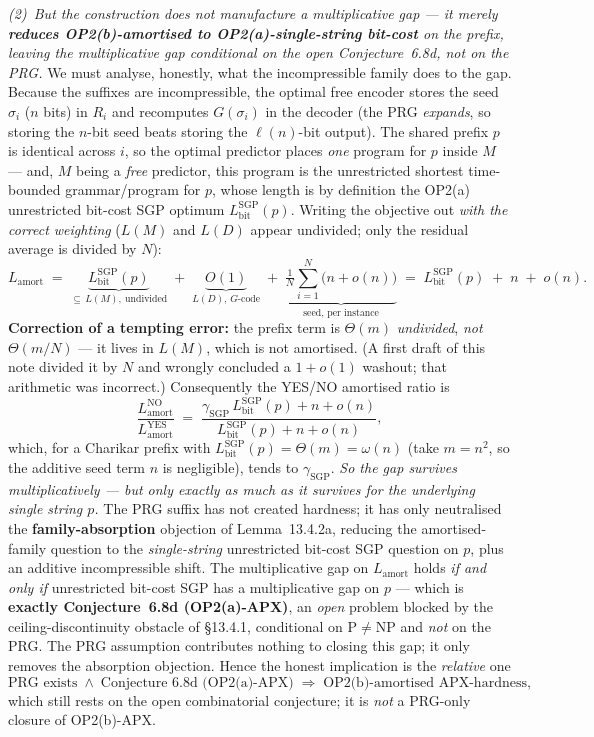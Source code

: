 \documentclass[
]{article}
\begin{document}
\emph{(2)~But the construction does not \emph{manufacture} a
multiplicative gap --- it merely \textbf{reduces OP2(b)-amortised to
OP2(a)-single-string bit-cost} on the prefix, leaving the multiplicative
gap conditional on the \emph{open} Conjecture~6.8d, not on the PRG.} We
must analyse, honestly, what the incompressible family does to the gap.
Because the suffixes are incompressible, the optimal free encoder stores
the seed $\sigma_i$ ($n$ bits) in $R_i$ and recomputes $G(\sigma_i)$ in
the decoder (the PRG \emph{expands}, so storing the $n$-bit seed beats
storing the $\ell(n)$-bit output). The shared prefix $p$ is identical
across $i$, so the optimal predictor places \emph{one} program for $p$
inside $M$ --- and, $M$ being a \emph{free} predictor, this program is
the unrestricted shortest time-bounded grammar/program for $p$, whose
length is by definition the OP2(a) unrestricted bit-cost SGP optimum
$L^{\mathrm{SGP}}_{\mathrm{bit}}(p)$. Writing the objective out
\emph{with the correct weighting} ($L(M)$ and $L(D)$ appear undivided;
only the residual average is divided by $N$):
\[
  L_{\mathrm{amort}}
  \;=\; \underbrace{L^{\mathrm{SGP}}_{\mathrm{bit}}(p)}_{\subseteq\, L(M),\ \text{undivided}}
  \;+\; \underbrace{O(1)}_{L(D),\,G\text{-code}}
  \;+\; \underbrace{\tfrac1N\textstyle\sum_{i=1}^N \big(n+o(n)\big)}_{\text{seed, per instance}}
  \;=\; L^{\mathrm{SGP}}_{\mathrm{bit}}(p) \;+\; n \;+\; o(n).
\]
\textbf{Correction of a tempting error:} the prefix term is
$\Theta(m)$ \emph{undivided}, \emph{not} $\Theta(m/N)$ --- it lives in
$L(M)$, which is not amortised. (A first draft of this note divided it
by $N$ and wrongly concluded a $1+o(1)$ washout; that arithmetic was
incorrect.) Consequently the YES/NO amortised ratio is
\[
  \frac{L_{\mathrm{amort}}^{\mathrm{NO}}}{L_{\mathrm{amort}}^{\mathrm{YES}}}
  \;=\;\frac{\gamma_{\mathrm{SGP}}\,L^{\mathrm{SGP}}_{\mathrm{bit}}(p)+n+o(n)}
           {L^{\mathrm{SGP}}_{\mathrm{bit}}(p)+n+o(n)},
\]
which, for a Charikar prefix with $L^{\mathrm{SGP}}_{\mathrm{bit}}(p)
=\Theta(m)=\omega(n)$ (take $m=n^2$, so the additive seed term $n$ is
negligible), tends to $\gamma_{\mathrm{SGP}}$. \emph{So the gap survives
multiplicatively --- but only exactly as much as it survives for the
underlying single string $p$.} The PRG suffix has not created hardness;
it has only neutralised the \textbf{family-absorption} objection of
Lemma~13.4.2a, reducing the amortised-family question to the
\emph{single-string} unrestricted bit-cost SGP question on $p$, plus an
additive incompressible shift. The multiplicative gap on
$L_{\mathrm{amort}}$ holds \emph{if and only if} unrestricted bit-cost
SGP has a multiplicative gap on $p$ --- which is \textbf{exactly
Conjecture~6.8d (OP2(a)-APX)}, an \emph{open} problem blocked by the
ceiling-discontinuity obstacle of §13.4.1, conditional on
$\mathrm{P}\neq\mathrm{NP}$ and \emph{not} on the PRG. The PRG
assumption contributes nothing to closing this gap; it only removes the
absorption objection. Hence the honest implication is the \emph{relative}
one
\[
  \text{PRG exists} \;\wedge\; \text{Conjecture~6.8d (OP2(a)-APX)}
  \;\Longrightarrow\; \text{OP2(b)-amortised APX-hardness},
\]
which still rests on the open combinatorial conjecture; it is \emph{not}
a PRG-only closure of OP2(b)-APX.
\end{document}
